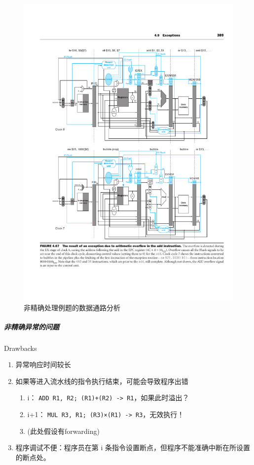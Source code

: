 \documentclass[]{report}
\begin{document}
\begin{figure}[h]
\begin{minipage}{20em}
				\includegraphics[scale = 0.35]{images/Datapath_of_Example_for_Pipeline_Exceptions_NonExact.pdf}
				\caption{非精确处理例题的数据通路分析}
			\end{minipage}
		\end{figure}
		\subparagraph{非精确异常的问题} Drawbacks
		\begin{enumerate}
			\item 异常响应时间较长
			\item 如果等进入流水线的指令执行结束，可能会导致程序出错
			\begin{enumerate}
				\item i： \verb|ADD R1, R2; (R1)+(R2) -> R1|，如果此时溢出？
				\item i+1： \verb|MUL R3, R1; (R3)×(R1) -> R3|，无效执行！
				\item (此处假设有forwarding)
			\end{enumerate}
			\item 程序调试不便：程序员在第 i 条指令设置断点，但程序不能准确中断在所设置的断点处。
		\end{enumerate}
\end{document}

